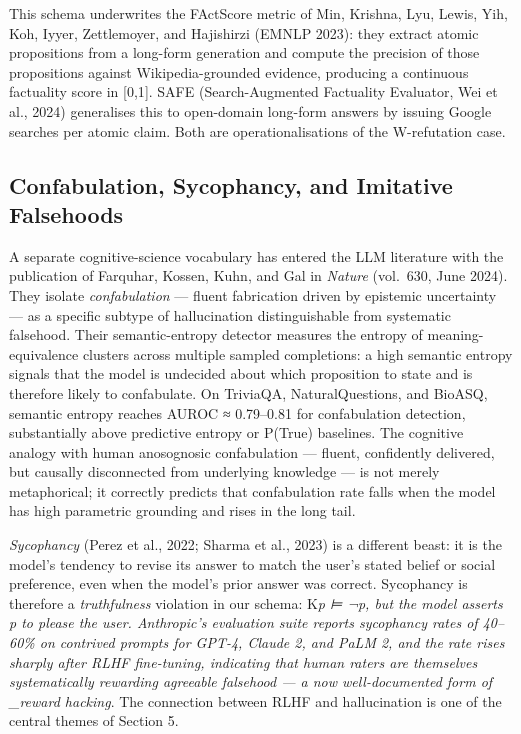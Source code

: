 This schema underwrites the FActScore metric of Min, Krishna, Lyu, Lewis, Yih, Koh, Iyyer, Zettlemoyer, and Hajishirzi (EMNLP 2023): they extract atomic propositions from a long-form generation and compute the precision of those propositions against Wikipedia-grounded evidence, producing a continuous factuality score in {[}0,1{]}. SAFE (Search-Augmented Factuality Evaluator, Wei et al., 2024) generalises this to open-domain long-form answers by issuing Google searches per atomic claim. Both are operationalisations of the W-refutation case.

\subsection{Confabulation, Sycophancy, and Imitative Falsehoods}\label{confabulation-sycophancy-and-imitative-falsehoods}

A separate cognitive-science vocabulary has entered the LLM literature with the publication of Farquhar, Kossen, Kuhn, and Gal in \emph{Nature} (vol.~630, June 2024). They isolate \emph{confabulation} --- fluent fabrication driven by epistemic uncertainty --- as a specific subtype of hallucination distinguishable from systematic falsehood. Their semantic-entropy detector measures the entropy of meaning-equivalence clusters across multiple sampled completions: a high semantic entropy signals that the model is undecided about which proposition to state and is therefore likely to confabulate. On TriviaQA, NaturalQuestions, and BioASQ, semantic entropy reaches AUROC ≈ 0.79--0.81 for confabulation detection, substantially above predictive entropy or P(True) baselines. The cognitive analogy with human anosognosic confabulation --- fluent, confidently delivered, but causally disconnected from underlying knowledge --- is not merely metaphorical; it correctly predicts that confabulation rate falls when the model has high parametric grounding and rises in the long tail.

\emph{Sycophancy} (Perez et al., 2022; Sharma et al., 2023) is a different beast: it is the model's tendency to revise its answer to match the user's stated belief or social preference, even when the model's prior answer was correct. Sycophancy is therefore a \emph{truthfulness} violation in our schema: K\emph{p ⊨ ¬p, but the model asserts p to please the user. Anthropic's evaluation suite reports sycophancy rates of 40--60\% on contrived prompts for GPT-4, Claude 2, and PaLM 2, and the rate rises sharply after RLHF fine-tuning, indicating that human raters are themselves systematically rewarding agreeable falsehood --- a now well-documented form of \_reward hacking}. The connection between RLHF and hallucination is one of the central themes of Section 5.

